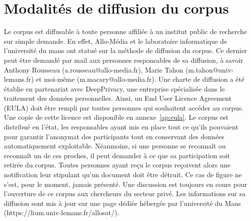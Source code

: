 \section{Modalités de diffusion du corpus}
Le corpus est diffusable à toute personne affiliée à un institut public de recherche sur simple demande. En effet, Allo-Média et le laboratoire informatique de l'université du mans ont statué sur la méthode de diffusion du corpus.
Ce dernier peut être demandé par mail aux personnes responsables de sa diffusion, à savoir Anthony Rousseau (a.rousseau@allo-media.fr), Marie Tahon (m.tahon@univ-lemans.fr) et moi-même (m.macary@allo-media.fr). Une charte de diffusion a été établie en partenariat avec DeepPrivacy, une entreprise spécialisée dans le traitement des données personnelles. Ainsi, un End User Licence Agreement (EULA) doit être rempli par toutes personnes qui souhaitent accéder au corpus. Une copie de cette licence est disponible en annexe~\ref{ap:eula}.
Le corpus est distribué en l'état, les responsables ayant mis en place tout ce qu'ils pouvaient pour garantir l'anonymat des participants tout en conservant des données automatiquement exploitable. Néanmoins, si une personne se reconnaît ou reconnaît un de ces proches, il peut demander à ce que sa participation soit retirée du corpus.
Toutes personnes ayant reçu le corpus reçoivent alors une notification leur stipulant qu'un document doit être détruit. Ce cas de figure ne s'est, pour le moment, jamais présenté.
Une discussion est toujours en cours pour l'ouverture de ce corpus aux chercheurs du secteur privé. Les informations sur sa diffusion sont mis à jour sur une page dédiée hébergée par l'université du Mans (https://lium.univ-lemans.fr/allosat/).
